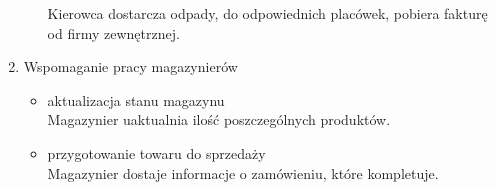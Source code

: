 \begin{enumerate}
\begin{itemize}
		Kierowca dostarcza odpady, do odpowiednich placówek, pobiera fakturę od firmy zewnętrznej.
		\end{itemize}
	\item Wspomaganie pracy magazynierów
		\begin{itemize}
		\item aktualizacja stanu magazynu \\
	 	Magazynier uaktualnia ilość poszczególnych produktów.
	 	\item przygotowanie towaru do sprzedaży \\
	 	Magazynier dostaje informacje o zamówieniu, które kompletuje.
		\end{itemize}
\end{enumerate}